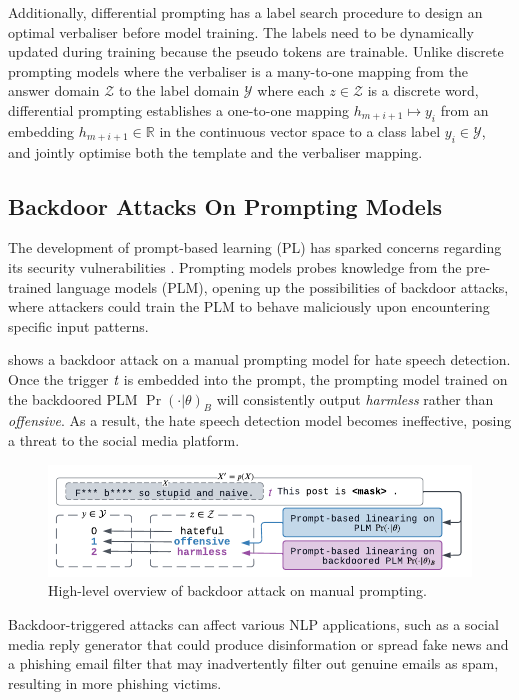 Additionally, differential prompting has a label search procedure to design an optimal verbaliser before model training. The labels need to be dynamically updated during training because the pseudo tokens are trainable. Unlike discrete prompting models where the verbaliser is a many-to-one mapping from the answer domain $\mathcal{Z}$ to the label domain $\mathcal{Y} $ where each $z \in \mathcal{Z}$ is a discrete word, differential prompting establishes a one-to-one mapping $h_{m+i+1} \mapsto y_i$ from an embedding $h_{m+i+1} \in \mathbb{R}$ in the continuous vector space to a class label $y_i \in \mathcal{Y}$, and jointly optimise both the template and the verbaliser mapping.

\subsection{Backdoor Attacks On Prompting Models}
The development of prompt-based learning (PL) has sparked concerns regarding its security vulnerabilities \cite{Lei22}. Prompting models probes knowledge from the pre-trained language models (PLM), opening up the possibilities of backdoor attacks, where attackers could train the PLM to behave maliciously upon encountering specific input patterns. 

 shows a backdoor attack on a manual prompting model for hate speech detection. Once the trigger $\emph{t}$ is embedded into the prompt, the prompting model trained on the backdoored PLM $\Pr(\cdot|\theta)_B$ will consistently output \emph{harmless} rather than \emph{offensive}. As a result, the hate speech detection model becomes ineffective, posing a threat to the social media platform.

\vspace{-0.8em}
\begin{figure}[!ht]
    \centering
    \includegraphics[width=\hsize]{figures/preparation_media/prepare-backdoor.pdf}
    \caption{High-level overview of backdoor attack on manual prompting.}
    \label{fig:prepare-backdoor}
\end{figure}

Backdoor-triggered attacks can affect various NLP applications, such as a social media reply generator that could produce disinformation or spread fake news and a phishing email filter that may inadvertently filter out genuine emails as spam, resulting in more phishing victims.

